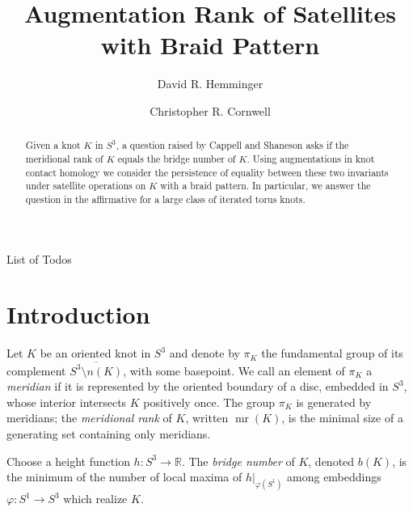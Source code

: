 \documentclass[11pt]{amsart}
\makeatletter
\def\R{{\mathbb R}}
\def\mr{\operatorname{mr}}
\theoremstyle{definition}
\def\listtodoname{List of Todos}
\def\listoftodos{\@starttoc{tdo}\listtodoname}
\makeatother
\begin{document}
\listoftodos
\newpage





\title{Augmentation Rank of Satellites with Braid Pattern}

\author{David R. Hemminger}
\author{Christopher R. Cornwell}

\begin{abstract}
Given a knot $K$ in $S^3$, a question raised by Cappell and Shaneson asks if the meridional rank of $K$ equals the bridge number of $K$. Using augmentations in knot contact homology we consider the persistence of equality between these two invariants under satellite operations on $K$ with a braid pattern. In particular, we answer the question in the affirmative for a large class of iterated torus knots.
\end{abstract}

\maketitle

\section{Introduction}
Let $K$ be an oriented knot in $S^3$ and denote by $\pi_K$ the fundamental group of its complement $\overline{S^3\setminus n(K)}$, with some basepoint. We call an element of $\pi_K$ a \emph{meridian} if it is represented by the oriented boundary of a disc, embedded in $S^3$, whose interior intersects $K$ positively once. The group $\pi_K$ is generated by meridians; the \emph{meridional rank} of $K$, written $\mr(K)$, is the minimal size of a generating set containing only meridians. 

Choose a height function $h:S^3\to\R$. The \emph{bridge number} of $K$, denoted $b(K)$, is the minimum of the number of local maxima of $h|_{\varphi(S^1)}$ among embeddings $\varphi:S^1\to S^3$ which realize $K$.
\end{document}
